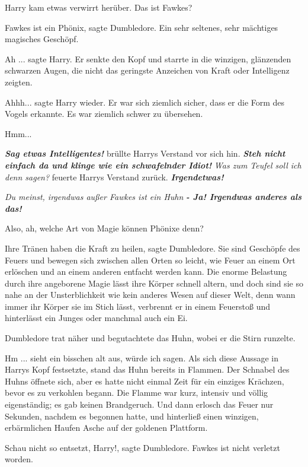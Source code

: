 Harry kam etwas verwirrt herüber. \glqq Das ist Fawkes?\grqq{}

\glqq Fawkes ist ein Phönix\grqq{}, sagte Dumbledore. \glqq Ein sehr seltenes,
sehr mächtiges magisches Geschöpf.\grqq{}

\glqq Ah ...\grqq{} sagte Harry. Er senkte den Kopf und starrte in die winzigen,
glänzenden schwarzen Augen, die nicht das geringste Anzeichen von Kraft oder
Intelligenz zeigten.

\glqq Ahhh...\grqq{} sagte Harry wieder. Er war sich ziemlich sicher, dass er
die Form des Vogels erkannte. Es war ziemlich schwer zu übersehen.

\glqq Hmm...\grqq{}

\textbf{\emph{Sag etwas Intelligentes!}} brüllte Harrys Verstand vor sich hin.
\textbf{\emph{Steh nicht einfach da und klinge wie ein schwafelnder Idiot! }}
\emph{Was zum Teufel soll ich denn sagen? }feuerte Harrys Verstand zurück.
\textbf{\emph{Irgendetwas!}}

\emph{Du meinst, irgendwas außer \glqq Fawkes ist ein Huhn\grqq{} }
\textbf{\emph{- Ja! Irgendwas anderes als das!}}

\glqq Also, ah, welche Art von Magie können Phönixe denn?\grqq{}

\glqq Ihre Tränen haben die Kraft zu heilen\grqq{}, sagte Dumbledore. \glqq Sie
sind Geschöpfe des Feuers und bewegen sich zwischen allen Orten so leicht, wie
Feuer an einem Ort erlöschen und an einem anderen entfacht werden kann. Die
enorme Belastung durch ihre angeborene Magie lässt ihre Körper schnell altern,
und doch sind sie so nahe an der Unsterblichkeit wie kein anderes Wesen auf
dieser Welt, denn wann immer ihr Körper sie im Stich lässt, verbrennt er in
einem Feuerstoß und hinterlässt ein Junges oder manchmal auch ein Ei.\grqq{}

Dumbledore trat näher und begutachtete das Huhn, wobei er die Stirn runzelte.

\glqq Hm ... sieht ein bisschen alt aus, würde ich sagen.\grqq{} Als sich diese
Aussage in Harrys Kopf festsetzte, stand das Huhn bereits in Flammen. Der
Schnabel des Huhns öffnete sich, aber es hatte nicht einmal Zeit für ein
einziges Krächzen, bevor es zu verkohlen begann. Die Flamme war kurz, intensiv
und völlig eigenständig; es gab keinen Brandgeruch. Und dann erlosch das Feuer
nur Sekunden, nachdem es begonnen hatte, und hinterließ einen winzigen,
erbärmlichen Haufen Asche auf der goldenen Plattform.

\glqq Schau nicht so entsetzt, Harry!\grqq{}, sagte Dumbledore. \glqq Fawkes ist
nicht verletzt worden.\grqq{}

